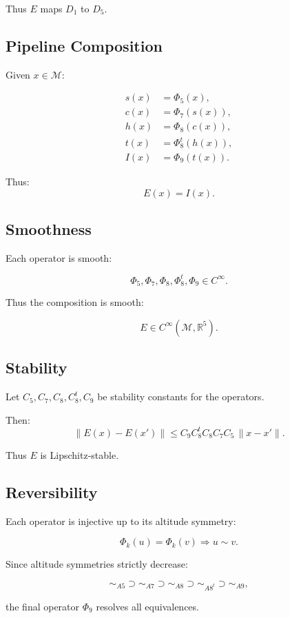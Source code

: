 Thus $E$ maps $D_1$ to $D_5$.

\subsection{Pipeline Composition}

Given $x \in \mathcal{M}$:

\[
\begin{aligned}
s(x) &= \Phi_5(x), \\
c(x) &= \Phi_7(s(x)), \\
h(x) &= \Phi_8(c(x)), \\
t(x) &= \Phi_8^t(h(x)), \\
I(x) &= \Phi_9(t(x)).
\end{aligned}
\]

Thus:
\[
E(x) = I(x).
\]

\subsection{Smoothness}

Each operator is smooth:

\[
\Phi_5, \Phi_7, \Phi_8, \Phi_8^t, \Phi_9 \in C^\infty.
\]

Thus the composition is smooth:

\[
E \in C^\infty(\mathcal{M}, \mathbb{R}^5).
\]

\subsection{Stability}

Let $C_5, C_7, C_8, C_8^t, C_9$ be stability constants for the operators.

Then:
\[
\| E(x) - E(x') \|
\le
C_9 C_8^t C_8 C_7 C_5 \, \| x - x' \|.
\]

Thus $E$ is Lipschitz-stable.

\subsection{Reversibility}

Each operator is injective up to its altitude symmetry:

\[
\Phi_k(u) = \Phi_k(v) \Rightarrow u \sim v.
\]

Since altitude symmetries strictly decrease:

\[
\sim_{A5} \supset \sim_{A7} \supset \sim_{A8} \supset \sim_{A8^t} \supset \sim_{A9},
\]

the final operator $\Phi_9$ resolves all equivalences.

